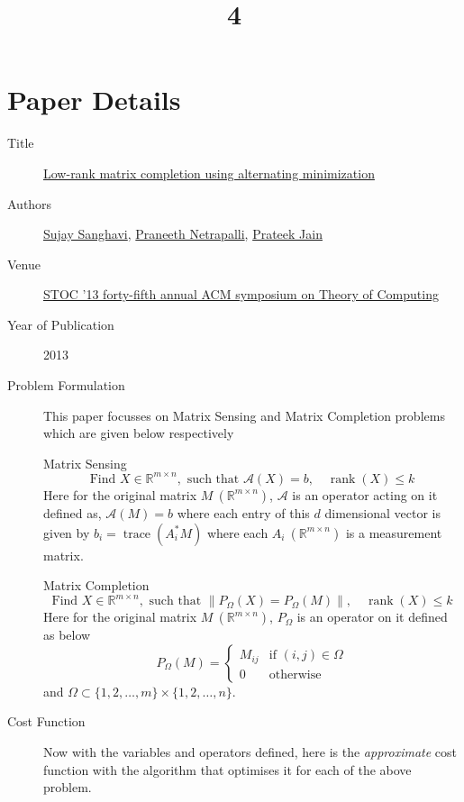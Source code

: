 \documentclass[a4paper]{article}
\title{4}
\date{}
\begin{document}
\maketitle
\section{Paper Details}
\begin{description}
	\item[Title] \href{https://dl.acm.org/doi/abs/10.1145/2488608.2488693}{Low-rank matrix completion using alternating minimization}
	\item[Authors]  \href{https://dl.acm.org/profile/81100644576}{Sujay Sanghavi}, \href{https://dl.acm.org/profile/81502809800}{Praneeth Netrapalli}, \href{https://dl.acm.org/profile/81549254456}{Prateek Jain}
	\item[Venue] \href{https://dl.acm.org/doi/proceedings/10.1145/2488608}{STOC '13 forty-fifth annual ACM symposium on Theory of Computing}
	\item[Year of Publication] 2013
	\item[Problem Formulation]
	This paper focusses on Matrix Sensing and Matrix Completion problems which are given below respectively

	Matrix Sensing
	\begin{equation}
	\text{Find } X \in \mathbb{R}^{m\times n}, \text{ such that } \mathcal{A}(X)=b, \quad \operatorname{rank}(X) \leq k
	\end{equation}
	Here for the original matrix $M \ (\mathbb{R}^{m\times n})$, $\mathcal{A}$ is an operator acting on it defined as, $\mathcal{A}(M)=b$ where each entry of this $d$ dimensional vector is given by $b_i=\operatorname{trace}(A_i^*M)$ where each $A_i \ (\mathbb{R}^{m\times n})$ is a measurement matrix.

	Matrix Completion
	\begin{equation}
	\text{Find } X \in \mathbb{R}^{m\times n}, \text{ such that } \|P_{\Omega}(X)=P_{\Omega}(M)\|, \quad \operatorname{rank}(X) \leq k
	\end{equation}
	Here for the original matrix $M \ (\mathbb{R}^{m\times n})$, $P_{\Omega}$ is an operator on it defined as below
	\begin{equation}
	P_{\Omega}(M) = \begin{cases}
	M_{ij} & \text{if } (i,j) \in \Omega\\
	0 & \text{otherwise}
	\end{cases}
	\end{equation}
	and $\Omega \subset \{1,2,\ldots,m\}\times\{1,2,\ldots,n\}$.
	\item[Cost Function]
	Now with the variables and operators defined, here is the \emph{approximate} cost function with the algorithm that optimises it for each of the above problem.


\end{description}
\end{document}
